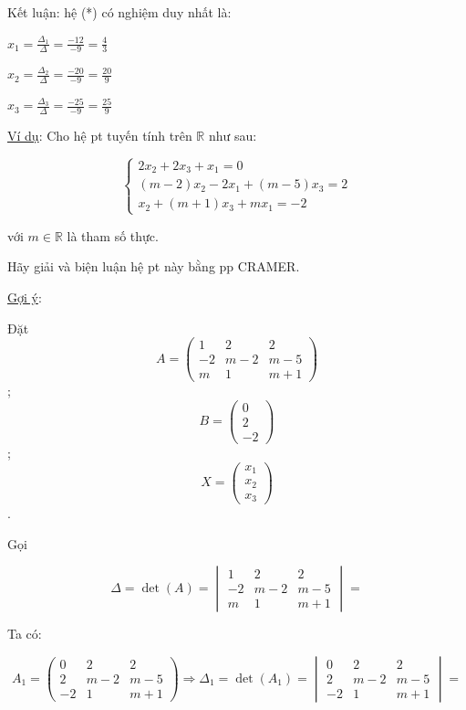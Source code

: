 \documentclass[
]{article}
\let\ul\uline
\begin{document}
Kết luận: hệ (*) có nghiệm duy nhất là:

$x_1 = \frac{\Delta_1}{\Delta} = \frac{-12}{-9} = \frac{4}{3}$

$x_2 = \frac{\Delta_2}{\Delta} = \frac{-20}{-9} = \frac{20}{9}$

$x_3 = \frac{\Delta_3}{\Delta} = \frac{-25}{-9} = \frac{25}{9}$

\ul{Ví dụ}: Cho hệ pt tuyến tính trên
$\mathbb{R}$ như sau:

$$\begin{cases} 2x_2 + 2x_3 + x_1 = 0 \\ (m-2)x_2 - 2x_1 + (m-5)x_3 = 2 \\ x_2 + (m+1)x_3 + mx_1 = -2 \end{cases}$$

với $m \in \mathbb{R}$ là tham số
thực.

Hãy giải và biện luận hệ pt này bằng pp CRAMER.

\ul{Gợi ý}:

Đặt $$A = \begin{pmatrix} 1 & 2 & 2 \\ -2 & m-2 & m-5 \\ m & 1 & m+1 \end{pmatrix}$$;
$$B = \begin{pmatrix} 0 \\ 2 \\ -2 \end{pmatrix}$$;
$$X = \begin{pmatrix} x_1 \\ x_2 \\ x_3 \end{pmatrix}$$.

Gọi

$$\Delta = \det(A) = \begin{vmatrix} 1 & 2 & 2 \\ -2 & m-2 & m-5 \\ m & 1 & m+1 \end{vmatrix} =$$

Ta có:

$$A_1 = \begin{pmatrix} 0 & 2 & 2 \\ 2 & m-2 & m-5 \\ -2 & 1 & m+1 \end{pmatrix} \Rightarrow \Delta_1 = \det(A_1) = \begin{vmatrix} 0 & 2 & 2 \\ 2 & m-2 & m-5 \\ -2 & 1 & m+1 \end{vmatrix} =$$
\end{document}
